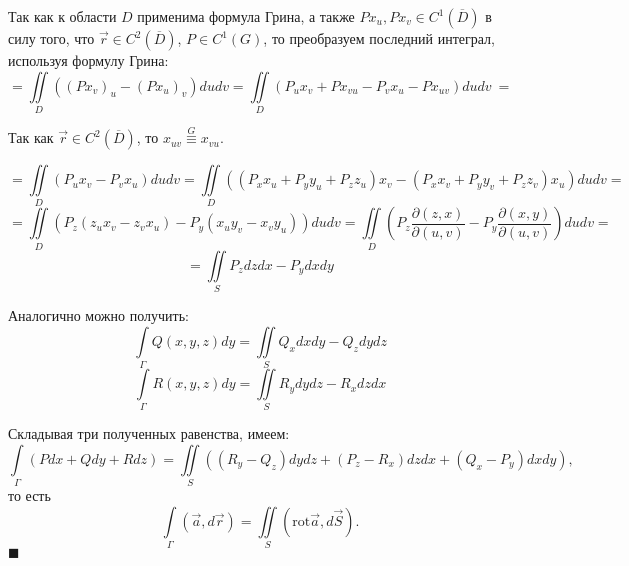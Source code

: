 \documentclass[12pt, a4paper, reqno]{article}
\begin{document}
    Так как к области $D$ применима формула Грина, а также $Px_u, Px_v \in C^1(\overline{D})$ в силу
    того, что $\vec{r} \in C^2(\overline{D})$, $P \in C^1(G)$, то преобразуем последний интеграл,
    используя формулу Грина:
    \begin{equation*}
        \boxed{=} \iint\limits_{D} ((Px_v)_u - (Px_u)_v) du dv =
        \iint\limits_{D} (P_u x_v + P x_{vu} - P_v x_u - P x_{uv}) du dv\ \boxed{=}
    \end{equation*}

    Так как $\vec{r} \in C^2(\overline{D})$, то $x_{uv} \overset{G}{\equiv} x_{vu}$.

    \begin{equation*}
        \boxed{=} \iint\limits_{D} (P_u x_v - P_v x_u) du dv =
        \iint\limits_{D} ((P_x x_u + P_y y_u + P_z z_u) x_v - (P_x x_v + P_y y_v + P_z z_v) x_u) du dv =
    \end{equation*}
    \begin{equation*}
        = \iint\limits_{D} (P_z (z_u x_v - z_v x_u) - P_y (x_u y_v - x_v y_u)) du dv =
        \iint\limits_{D} \left(P_z \frac{\partial (z, x)}{\partial (u, v)} -
                               P_y \frac{\partial (x, y)}{\partial (u, v)}\right) du dv =
    \end{equation*}
    \begin{equation*}
        = \iint\limits_{S} P_z dz dx - P_y dx dy
    \end{equation*}

    Аналогично можно получить:
    \begin{equation*}
        \int\limits_{\Gamma} Q(x, y, z)dy = \iint\limits_{S} Q_x dx dy - Q_z dy dz
    \end{equation*}
    \begin{equation*}
        \int\limits_{\Gamma} R(x, y, z)dy = \iint\limits_{S} R_y dy dz - R_x dz dx
    \end{equation*}

    Складывая три полученных равенства, имеем:
    \begin{equation*}
        \int\limits_{\Gamma}(Pdx + Qdy + Rdz) =
        \iint\limits_{S} ((R_y - Q_z) dy dz + (P_z - R_x) dz dx + (Q_x - P_y) dx dy),
    \end{equation*}
    то есть
    \begin{equation*}
        \int\limits_{\Gamma} (\vec{a}, d\vec{r}) = \iint\limits_{S} (\text{rot}\vec{a}, d\vec{S}).
    \end{equation*}
    $\blacksquare$
\end{document}
